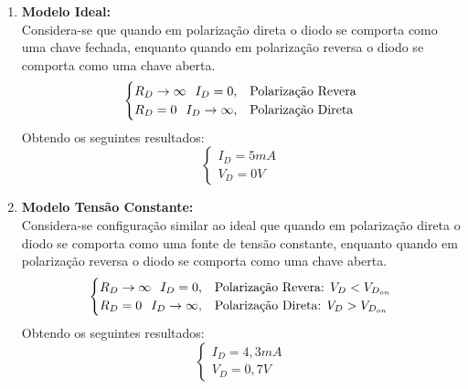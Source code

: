 \documentclass{article}
\begin{document}
                \begin{enumerate}
                    \item \textbf{Modelo Ideal:}\\
                    Considera-se que quando em polarização direta o diodo se comporta como uma chave fechada, enquanto quando em polarização reversa o diodo se comporta como uma chave aberta.
                        \[
                            \begin{cases}
                                R_{D} \to \infty \hspace{2.5mm} I_{D} = 0, &
                                \text{Polarização Revera}\\
                                R_{D} = 0 \hspace{2.5mm} I_{D} \to \infty, &
                                \text{Polarização Direta}
                            \end{cases}
                        \]
                    Obtendo os seguintes resultados:
                        \[
                            \boxed{
                                \begin{cases}
                                    I_{D} = 5 mA\\
                                    V_{D} = 0 V
                                \end{cases}
                            }
                        \]

                    \item \textbf{Modelo Tensão Constante:}\\
                    Considera-se configuração similar ao ideal que quando em polarização direta o diodo se comporta como uma fonte de tensão constante, enquanto quando em polarização reversa o diodo se comporta como uma chave aberta.
                        \[
                            \begin{cases}
                                R_{D} \to \infty \hspace{2.5mm} I_{D} = 0, &
                                \text{Polarização Revera: } V_{D} < V_{D_{on}}\\
                                R_{D} = 0 \hspace{2.5mm} I_{D} \to \infty, &
                                \text{Polarização Direta: } V_{D} > V_{D_{on}}
                            \end{cases}
                        \]
                    Obtendo os seguintes resultados:
                        \[
                            \boxed{
                                \begin{cases}
                                    I_{D} = 4,3 mA\\
                                    V_{D} = 0,7 V
                                \end{cases}
                            }
                        \]


\end{enumerate}
\end{document}
